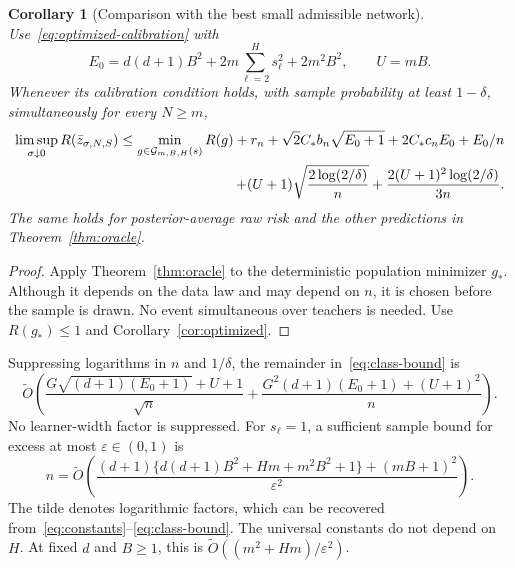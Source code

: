 \documentclass[11pt]{article}
\newtheorem{corollary}[theorem]{Corollary}
\theoremstyle{definition}\newtheorem{definition}[theorem]{Definition}
\theoremstyle{remark}\newtheorem{remark}[theorem]{Remark}
\begin{document}
\begin{corollary}[Comparison with the best small admissible network]
\label{cor:class}
Use~\eqref{eq:optimized-calibration} with
\[
 E_0=d(d+1)B^2+2m\sum_{\ell=2}^Hs_\ell^2+2m^2B^2,
 \qquad U=mB.
\]
Whenever its calibration condition holds, with sample probability at least $1-\delta$, simultaneously for every $N\geq m$,
\begin{align}
 \limsup_{\sigma\downarrow0}R(\bar z_{\sigma,N,S})
 \leq \min_{g\in\mathcal G_{m,B,H}(s)}R(g)
 +r_n+\sqrt2C_*b_n\sqrt{E_0+1}+2C_*c_nE_0+E_0/n\notag\\
 \hspace{6mm} +(U+1)\sqrt{\frac{2\log(2/\delta)}n}
             +\frac{2(U+1)^2\log(2/\delta)}{3n}.
 \label{eq:class-bound}
\end{align}
The same holds for posterior-average raw risk and the other predictions in Theorem~\ref{thm:oracle}.
\end{corollary}
\begin{proof}
Apply Theorem~\ref{thm:oracle} to the deterministic population minimizer $g_*$. Although it depends on the data law and may depend on $n$, it is chosen before the sample is drawn. No event simultaneous over teachers is needed. Use $R(g_*)\leq1$ and Corollary~\ref{cor:optimized}.
\end{proof}

Suppressing logarithms in $n$ and $1/\delta$, the remainder in~\eqref{eq:class-bound} is
\begin{equation}
 \widetilde O\left(
    \frac{G\sqrt{(d+1)(E_0+1)}+U+1}{\sqrt n}
   +\frac{G^2(d+1)(E_0+1)+(U+1)^2}{n}\right).
 \label{eq:rate}
\end{equation}
No learner-width factor is suppressed. For $s_\ell=1$, a sufficient sample bound for excess at most $\varepsilon\in(0,1)$ is
\begin{equation}
 n=\widetilde O\left(
  \frac{(d+1)\{d(d+1)B^2+Hm+m^2B^2+1\}+(mB+1)^2}
       {\varepsilon^2}\right).
 \label{eq:sample}
\end{equation}
The tilde denotes logarithmic factors, which can be recovered from~\eqref{eq:constants}--\eqref{eq:class-bound}. The universal constants do not depend on $H$. At fixed $d$ and $B\geq1$, this is $\widetilde O((m^2+Hm)/\varepsilon^2)$.
\end{document}
